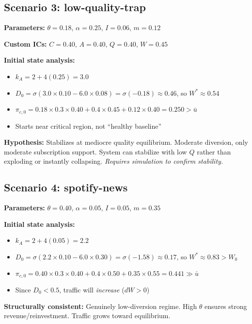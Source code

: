 \documentclass[11pt]{article}
\newcommand{\cmark}{\ding{51}}
\begin{document}
\subsection{Scenario 3: low-quality-trap}
\textbf{Parameters:} $\theta=0.18$, $\alpha=0.25$, $I=0.06$, $m=0.12$

\textbf{Custom ICs:} $C=0.40$, $A=0.40$, $Q=0.40$, $W=0.45$

\textbf{Initial state analysis:}
\begin{itemize}
    \item $k_A = 2 + 4(0.25) = 3.0$
    \item $D_0 = \sigma(3.0 \times 0.10 - 6.0 \times 0.08) = \sigma(-0.18) \approx 0.46$, so $W^* \approx 0.54$
    \item $\pi_{c,0} = 0.18 \times 0.3 \times 0.40 + 0.4 \times 0.45 + 0.12 \times 0.40 = 0.250 > \bar{u}$
    \item Starts near critical region, not ``healthy baseline''
\end{itemize}

\textcolor{myorange}{\textbf{Hypothesis:}} Stabilizes at mediocre quality equilibrium. Moderate diversion, only moderate subscription support. System can stabilize with low $Q$ rather than exploding or instantly collapsing. \textit{Requires simulation to confirm stability.}

\subsection{Scenario 4: spotify-news}
\textbf{Parameters:} $\theta=0.40$, $\alpha=0.05$, $I=0.05$, $m=0.35$

\textbf{Initial state analysis:}
\begin{itemize}
    \item $k_A = 2 + 4(0.05) = 2.2$
    \item $D_0 = \sigma(2.2 \times 0.10 - 6.0 \times 0.30) = \sigma(-1.58) \approx 0.17$, so $W^* \approx 0.83 > W_0$
    \item $\pi_{c,0} = 0.40 \times 0.3 \times 0.40 + 0.4 \times 0.50 + 0.35 \times 0.55 = 0.441 \gg \bar{u}$
    \item Since $D_0 < 0.5$, traffic will \textit{increase} ($dW > 0$)
\end{itemize}

\textcolor{mygreen}{\cmark} \textbf{Structurally consistent:} Genuinely low-diversion regime. High $\theta$ ensures strong revenue/reinvestment. Traffic grows toward equilibrium.
\end{document}
